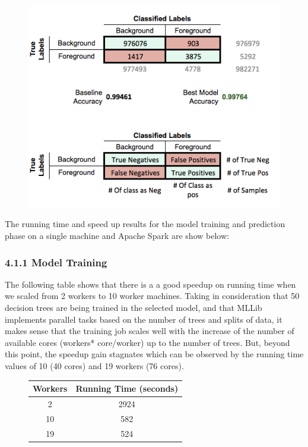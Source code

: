 \documentclass{neu_handout}
\begin{document}
\begin{center}
\begin{figure}[!h]
\centering
  \includegraphics[width=0.5\linewidth]{confusionmatrix}
  \label{fig:confusionmatrix}
\end{figure}
\end{center}

The running time and speed up results for the model training and prediction phase on a single machine and Apache Spark are show below:

\subsubsection*{4.1.1 Model Training}

The following table shows that there is a a good speedup on running time when we scaled from 2 workers to 10 worker machines. Taking in consideration that 50 decision trees are being trained in the selected model, and that MLLib implements parallel tasks based on the number of trees and splits of data, it makes sense that the training job scales well with the increase of the number of available cores (workers* core/worker) up to the number of trees. But, beyond this point, the speedup gain stagnates which can be observed by the running time values of 10 (40 cores) and 19  workers (76 cores). 

\begin{figure}[!htb]
\begin{center}
 \begin{tabular}{||c c ||}
 \hline
Workers & Running Time (seconds) \\ [0.5ex] 
 \hline\hline
  2 & 2924  \\ 
  \hline
 10 & 582  \\ 
  \hline
 19 & 524  \\ [1ex] 
 \hline
\end{tabular}
\end{center}
\end{figure}
\end{document}
